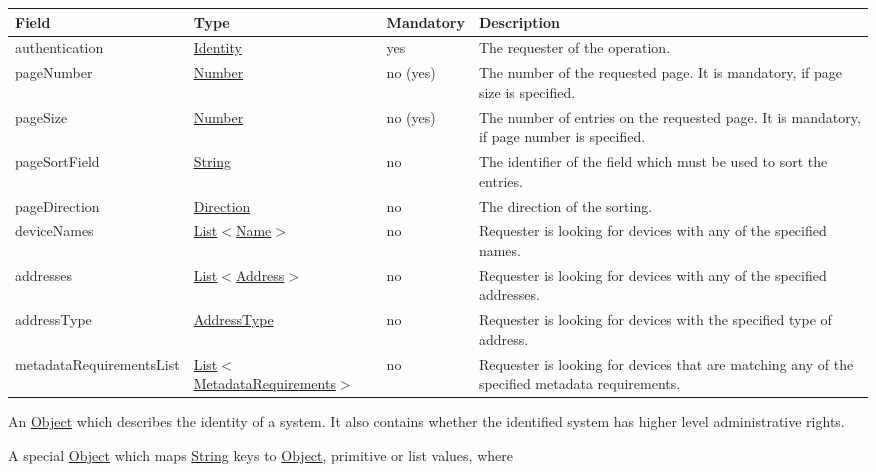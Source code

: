 \documentclass[a4paper]{arrowhead}
\newcommand{\pref}[1]{{\textcolor{ArrowheadGrey}{\hyperref[sec:model:primitives:#1]{#1}}}}
\begin{document}
\begin{table}[ht!]
\begin{tabularx}{\textwidth}{| p{4.3cm} | p{4.8cm} | p{2cm} | X |} \hline
\rowcolor{gray!33} Field & Type & Mandatory & Description \\ \hline
authentication & \hyperref[sec:model:Identity]{Identity} & yes & The requester of the operation. \\ \hline
pageNumber & \pref{Number} & no (yes) & The number of the requested page. It is mandatory, if page size is specified. \\ \hline
pageSize & \pref{Number} & no (yes) & The number of entries on the requested page. It is mandatory, if page number is specified. \\ \hline
pageSortField & \pref{String} & no & The identifier of the field which must be used to sort the entries. \\ \hline
pageDirection & \pref{Direction} & no & The direction of the sorting. \\ \hline
deviceNames &  \pref{List}$<$\pref{Name}$>$ & no & Requester is looking for devices with any of the specified names. \\ \hline
addresses &  \pref{List}$<$\pref{Address}$>$ & no & Requester is looking for devices with any of the specified add\-resses.   \\ \hline
addressType &  \pref{AddressType} & no & Requester is looking for devices with the specified type of add\-ress. \\ \hline
metadataRequirementsList & \pref{List}$<$\hyperref[sec:model:MetadataRequirements]{MetadataRequirements}$>$ & no & Requester is looking for devices that are matching any of the specified metadata requirements. \\ \hline
\end{tabularx}
\end{table}


An \pref{Object} which describes the identity of a system. It also contains whether the identified system has higher level administrative rights.


A special \pref{Object} which maps \pref{String} keys to \pref{Object}, primitive or list values, where 
\end{document}
